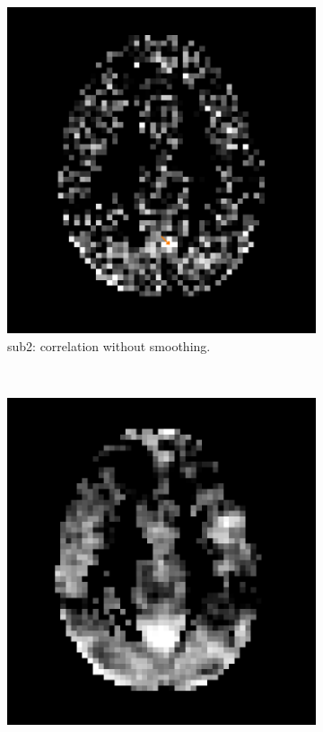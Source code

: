 \begin{figure}[p]
  \begin{subfigure}[t]{0.3\textwidth}
    \centering
    \includegraphics[width=\textwidth]{figures/method1/invivo2/R2_corr_nosmooth}
    \caption{sub2: correlation without smoothing.}
    \label{fig:invivo24}
    \end{subfigure}
~
  \begin{subfigure}[t]{0.3\textwidth}
    \centering
    \includegraphics[width=\textwidth]{figures/method1/invivo2/R2_corr_smooth}

\end{subfigure}
\end{figure}

